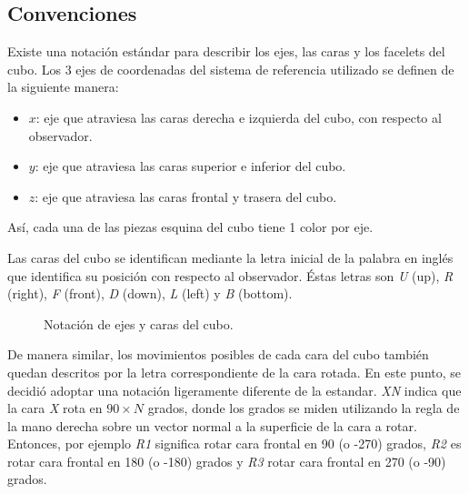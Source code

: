 \subsection*{Convenciones}
Existe una notación estándar para describir los ejes, las caras y los facelets del cubo.
Los 3 ejes de coordenadas del sistema de referencia utilizado se definen de la siguiente manera:
\begin{itemize}
	\item $x$: eje que atraviesa las caras derecha e izquierda del cubo, con respecto al observador.
	\item $y$: eje que atraviesa las caras superior e inferior del cubo.
	\item $z$: eje que atraviesa las caras frontal y trasera del cubo.
\end{itemize}
Así, cada una de las piezas esquina del cubo tiene 1 color por eje.

Las caras del cubo se identifican mediante la letra inicial de la palabra en inglés que identifica su posición con respecto al observador.
Éstas letras son \textit{U} (up), \textit{R} (right), \textit{F} (front), \textit{D} (down), \textit{L} (left) y \textit{B} (bottom).

\begin{figure}[h!]
	\centering
	\hfill
	\caption{Notación de ejes y caras del cubo.}
\end{figure}
De manera similar, los movimientos posibles de cada cara del cubo también quedan descritos por la letra correspondiente de la cara rotada.
En este punto, se decidió adoptar una notación ligeramente diferente de la estandar.
\textit{XN} indica que la cara \textit{X} rota en $90 \times N$ grados, donde los grados se miden utilizando la regla de la mano derecha sobre un vector normal a la superficie de la cara a rotar.
Entonces, por ejemplo \textit{R1} significa rotar cara frontal en 90 (o -270) grados, \textit{R2} es rotar cara frontal en 180 (o -180) grados y \textit{R3} rotar cara frontal en 270 (o -90) grados.

